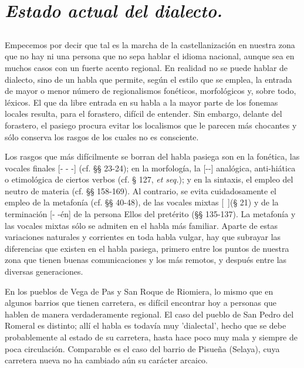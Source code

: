\section{\emph{Estado actual del dialecto.}}
\subsection{} Empecemos por decir que tal es la marcha de la castellanización en nuestra zona que no hay ni una persona que no sepa hablar el idioma nacional, aunque sea en muchos casos con un fuerte acento regional. En realidad no se puede hablar de dialecto, sino de un habla que permite,  según el estilo que se emplea, la entrada de mayor o menor número de regionalismos fonéticos, morfológicos y, sobre todo, léxicos. El que da libre entrada en su habla a la mayor parte de los fonemas locales resulta, para el forastero, difícil de entender. Sin embargo, delante del forastero, el pasiego procura evitar los localismos que le parecen más chocantes y sólo conserva los rasgos de los cuales no es consciente.

Los rasgos que más difícilmente se borran del habla pasiega son en la fonética, las vocales finales [- - -] 
(cf. §§ 23-24); en la morfología, la [--] analógica, anti-hiática o etimológica de ciertos verbos (cf. § 127, \emph{et seq.}); y en la sintaxis, el empleo del neutro de materia (cf. §§ 158-169). Al contrario, se evita cuidadosamente el empleo de la metafonía (cf. §§ 40-48), de las vocales mixtas [\ic\ \uc](§ 21) y de la terminación [-\apt{} -én]
 de la persona Ellos del pretérito (§§ 135-137). La metafonía y las vocales mixtas sólo se admiten en el habla más familiar.
Aparte de estas variaciones naturales y corrientes en toda habla vulgar, hay que subrayar las diferencias que existen en el habla pasiega, primero entre los puntos de nuestra zona que tienen buenas comunicaciones y los más remotos, y después entre las diversas generaciones.

En los pueblos de Vega de Pas y San Roque de Riomiera, lo mismo que en algunos barrios que tienen carretera, es difícil encontrar hoy a personas que hablen de manera verdaderamente regional. El caso del pueblo de San Pedro del Romeral es distinto; allí el habla es todavía
muy 'dialectal', hecho que se debe probablemente al estado de su carretera, hasta hace poco muy mala y siempre de poca circulación. Comparable es el caso del barrio de Pisueña (Selaya), cuya carretera nueva no ha cambiado aún su carácter arcaico. 

